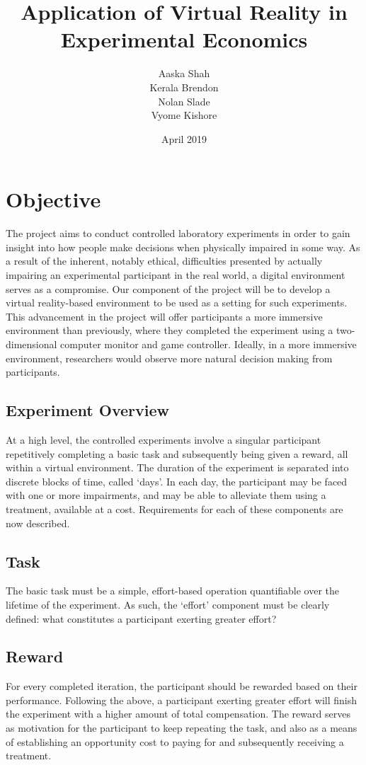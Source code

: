 \documentclass{article}
\title{Application of Virtual Reality in Experimental Economics}
\author{Aaska Shah\\Kerala Brendon\\Nolan Slade\\Vyome Kishore}
\date{April 2019}
\begin{document}
\maketitle
 
\newpage

\tableofcontents

\newpage

\section{Objective}
The project aims to conduct controlled laboratory experiments in order to gain insight into how people make decisions when physically impaired in some way. As a result of the inherent, notably ethical, difficulties presented by actually impairing an experimental participant in the real world, a digital environment serves as a compromise. Our component of the project will be to develop a virtual reality-based environment to be used as a setting for such experiments. This advancement in the project will offer participants a more immersive environment than previously, where they completed the experiment using a two-dimensional computer monitor and game controller. Ideally, in a more immersive environment, researchers would observe more natural decision making from participants.

\subsection{Experiment Overview}
At a high level, the controlled experiments involve a singular participant repetitively completing a basic task and subsequently being given a reward, all within a virtual environment. The duration of the experiment is separated into discrete blocks of time, called ‘days’. In each day, the participant may be faced with one or more impairments, and may be able to alleviate them using a treatment, available at a cost. Requirements for each of these components are now described.

\subsection{Task}
The basic task must be a simple, effort-based operation quantifiable over the lifetime of the experiment. As such, the ‘effort’ component must be clearly defined: what constitutes a participant exerting greater effort? 


\subsection{Reward}
For every completed iteration, the participant should be rewarded based on their performance. Following the above, a participant exerting greater effort will finish the experiment with a higher amount of total compensation. The reward serves as motivation for the participant to keep repeating the task, and also as a means of establishing an opportunity cost to paying for and subsequently receiving a treatment. 
\end{document}
